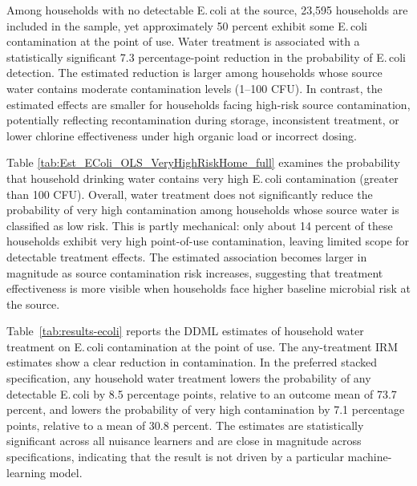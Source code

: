 \documentclass [11pt]{article}
\theoremstyle{plain}
\theoremstyle{definition}
\theoremstyle{remark}
\newcommand{\1}{\bm{1}}
\begin{document}
Among households with no detectable E.\,coli at the source, 23,595 households are included in the sample, yet approximately 50 percent exhibit some E.\,coli contamination at the point of use. Water treatment is associated with a statistically significant 7.3 percentage-point reduction in the probability of E.\,coli detection. The estimated reduction is larger among households whose source water contains moderate contamination levels (1--100 CFU). In contrast, the estimated effects are smaller for households facing high-risk source contamination, potentially reflecting recontamination during storage, inconsistent treatment, or lower chlorine effectiveness under high organic load or incorrect dosing.


{\renewcommand\normalsize{\small}\normalsize\singlespacing  

}  

Table \ref{tab:Est_EColi_OLS_VeryHighRiskHome_full} examines the probability that household drinking water contains very high E.\,coli contamination (greater than 100 CFU). Overall, water treatment does not significantly reduce the probability of very high contamination among households whose source water is classified as low risk. This is partly mechanical: only about 14 percent of these households exhibit very high point-of-use contamination, leaving limited scope for detectable treatment effects. The estimated association becomes larger in magnitude as source contamination risk increases, suggesting that treatment effectiveness is more visible when households face higher baseline microbial risk at the source.

{\renewcommand\normalsize{\small}\normalsize\singlespacing  
}  


Table~\ref{tab:results-ecoli} reports the DDML estimates of household water treatment on E.\,coli contamination at the point of use. The any-treatment IRM estimates show a clear reduction in contamination. In the preferred stacked specification, any household water treatment lowers the probability of any detectable E.\,coli by 8.5 percentage points, relative to an outcome mean of 73.7 percent, and lowers the probability of very high contamination by 7.1 percentage points, relative to a mean of 30.8 percent. The estimates are statistically significant across all nuisance learners and are close in magnitude across specifications, indicating that the result is not driven by a particular machine-learning model.
\end{document}
